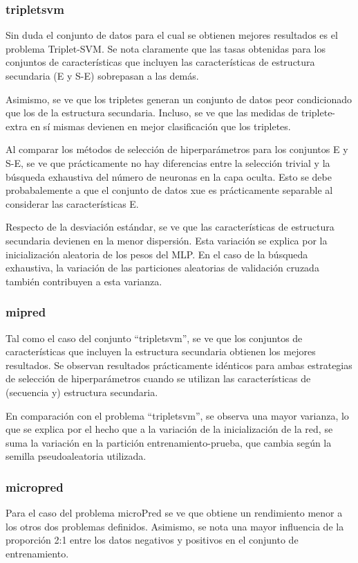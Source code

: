 \documentclass[12pt,bibliography=oldstyle,DIV=12,parskip=half-]{scrreprt}
\begin{document}
%
\subsubsection{tripletsvm}
%
Sin duda el conjunto de datos para el cual se obtienen mejores
resultados es el problema Triplet-SVM. Se nota claramente que las
tasas obtenidas para los conjuntos de características que incluyen las
características de estructura secundaria (E y S-E) sobrepasan a las
demás.

Asimismo, se ve que los tripletes generan un conjunto de datos peor
condicionado que los de la estructura secundaria. Incluso, se ve que
las medidas de triplete-extra en sí mismas devienen en mejor
clasificación que los tripletes.

Al comparar los métodos de selección de hiperparámetros para los
conjuntos E y S-E, se ve que prácticamente no hay diferencias entre la
selección trivial y la búsqueda exhaustiva del número de neuronas en
la capa oculta.  Esto se debe probabalemente a que el conjunto de
datos xue es prácticamente separable al considerar las características
E.

Respecto de la desviación estándar, se ve que las características de
estructura secundaria devienen en la menor dispersión. Esta variación
se explica por la inicialización aleatoria de los pesos del MLP. En el
caso de la búsqueda exhaustiva, la variación de las particiones
aleatorias de validación cruzada también contribuyen a esta varianza.
%
\subsubsection{mipred}
%
Tal como el caso del conjunto ``tripletsvm'', se ve que los conjuntos de
características que incluyen la estructura secundaria obtienen los
mejores resultados.  Se observan resultados prácticamente idénticos
para ambas estrategias de selección de hiperparámetros cuando se utilizan
las características de (secuencia y) estructura secundaria.

En comparación con el problema ``tripletsvm'', se observa una mayor
varianza, lo que se explica por el hecho que a la variación de la
inicialización de la red, se suma la variación en la partición
entrenamiento-prueba, que cambia según la semilla pseudoaleatoria
utilizada.
%
\subsubsection{micropred}
%
Para el caso del problema microPred se ve que obtiene un rendimiento
menor a los otros dos problemas definidos.  Asimismo, se nota una
mayor influencia de la proporción 2:1 entre los datos negativos y
positivos en el conjunto de entrenamiento.
%
%
\end{document}
